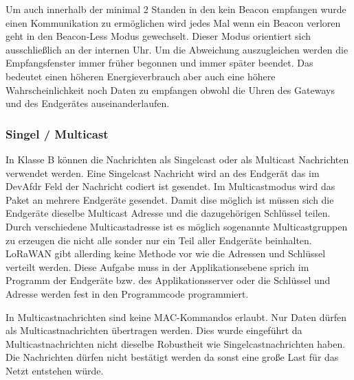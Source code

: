 \documentclass[a4paper,12pt]{article}
\begin{document}
                Um auch innerhalb der minimal 2 Standen in den kein Beacon empfangen wurde einen Kommunikation zu 
                ermöglichen wird jedes Mal wenn ein Beacon verloren geht in den Beacon-Less Modus gewechselt. Dieser 
                Modus orientiert sich ausschließlich an der internen Uhr.
                Um die Abweichung auszugleichen werden die Empfangsfenster immer früher begonnen und immer später 
                beendet. Das bedeutet einen höheren Energieverbrauch aber auch eine höhere Wahrscheinlichkeit noch 
                Daten zu empfangen obwohl die Uhren des Gateways und des Endgerätes auseinanderlaufen.

            \subsubsection{Singel / Multicast}
                In Klasse B können die Nachrichten als Singelcast oder als Multicast Nachrichten verwendet werden. 
                Eine Singelcast Nachricht wird an des Endgerät das im DevAfdr Feld der Nachricht codiert ist gesendet.
                Im Multicastmodus wird das Paket an mehrere Endgeräte gesendet. Damit dise möglich ist müssen sich 
                die Endgeräte dieselbe Multicast Adresse und die dazugehörigen Schlüssel teilen. Durch verschiedene 
                Multicastadresse ist es möglich sogenannte Multicastgruppen zu erzeugen die nicht alle sonder nur ein 
                Teil aller Endgeräte beinhalten. LoRaWAN gibt allerding keine Methode vor wie die Adressen und 
                Schlüssel verteilt werden. Diese Aufgabe muss in der Applikationsebene sprich im Programm der 
                Endgeräte bzw. des Applikationsserver oder die Schlüssel und Adresse werden fest in den Programmcode 
                programmiert.

                In Multicastnachrichten sind keine MAC-Kommandos erlaubt. Nur Daten dürfen als Multicastnachrichten 
                übertragen werden. Dies wurde eingeführt da Multicastnachrichten nicht dieselbe Robustheit wie 
                Singelcastnachrichten haben. Die Nachrichten dürfen nicht bestätigt werden da sonst eine große Last 
                für das Netzt entstehen würde.\cite[S.84]{LoRaSpec}
\end{document}
